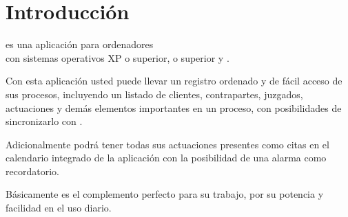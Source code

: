 \chapter{Introducci\'on}
\label{sec:intro}
\softwareAbogadosDesktop es una aplicaci\'on para ordenadores \\con
sistemas operativos \microsoft \windows XP o superior,  o superior y \linux. 

Con esta aplicaci\'on usted puede llevar un registro ordenado y de f\'acil acceso de sus procesos, incluyendo un listado de clientes, contrapartes, juzgados, actuaciones y dem\'as elementos importantes
en un proceso, con posibilidades de sincronizarlo con \softwareAbogadosMobile.

Adicionalmente podr\'a tener todas sus actuaciones presentes como citas en el
calendario integrado de la aplicaci\'on con la posibilidad de una alarma como
recordatorio.

B\'asicamente \softwareAbogadosDesktop es el complemento perfecto para su
trabajo, por su potencia y facilidad en el uso diario.